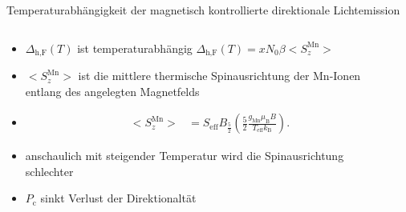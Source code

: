 \begin{frame}{Temperaturabhängigkeit der magnetisch kontrollierte direktionale Lichtemission}
    \begin{columns}
        \begin{column}{0.5\textwidth}
            \begin{itemize}
                \item <1-> $\Delta_\text{h,F}(T)$ ist temperaturabhängig  
                \rightarrow $\Delta_\text{h,F}(T) = xN_0\beta \bigl< S^\text{Mn}_{z} \bigr>$
                \item <2-> $\bigl< S^\text{Mn}_{z} \bigr>$ ist die mittlere thermische Spinausrichtung der Mn-Ionen entlang des angelegten
                Magnetfelds 
                \item <3->
                \begin{align*}
                    \label{eq:S}
                    \bigl< S^\text{Mn}_{z} \bigr> &= S_\text{eff} B_\text{$\frac{5}{2}$} \left(\frac{5}{2}\frac{g_\text{Mn} \mu_\text{B} B }{T_\text{eff} k_\text{B}} \right)\text{.}
                \end{align*}
                \bigskip
                \item <4-> anschaulich \rightarrow mit steigender Temperatur wird die Spinausrichtung schlechter 
                \item <5-> $P_\text{c}$ sinkt \rightarrow Verlust der Direktionaltät
            \end{itemize}
        \end{column}
        \begin{column}{0.5\textwidth}
            \centering
        \end{column}
    \end{columns}
\end{frame}